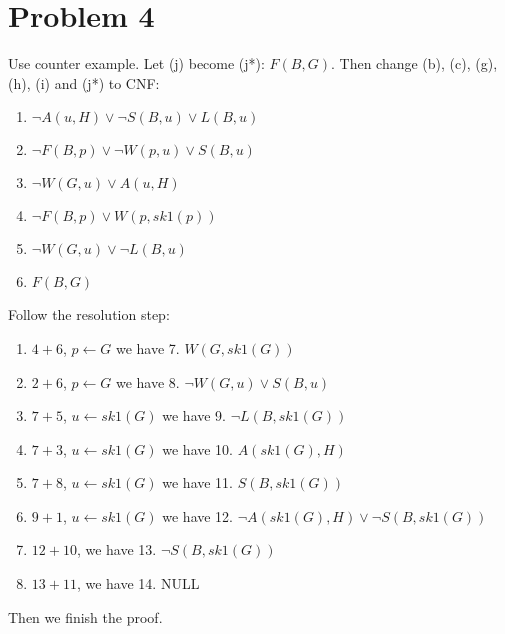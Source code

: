 \documentclass[11pt]{article}
\begin{document}
	\section*{Problem 4}
	Use counter example. Let (j) become (j*): $ F(B,G) $. Then change (b), (c), (g), (h), (i) and (j*) to CNF:
	\begin{enumerate}[1.]
		\item $ \neg A(u,H)\vee \neg S(B,u)\vee L(B,u) $
		\item $ \neg F(B,p)\vee \neg W(p,u)\vee S(B,u) $
		\item $ \neg W(G,u)\vee A(u,H) $
		\item $ \neg F(B,p)\vee W(p,sk1(p)) $
		\item $ \neg W(G,u)\vee \neg L(B,u) $
		\item $ F(B,G) $
	\end{enumerate}
	Follow the resolution step:
	\begin{enumerate}
		\item $ 4 + 6 $, $ p\leftarrow G $ we have 7. $ W(G,sk1(G)) $
		\item $ 2+6 $, $ p\leftarrow G $ we have 8. $ \neg W(G,u)\vee S(B,u) $
		\item $ 7+5 $, $ u\leftarrow sk1(G) $ we have 9. $ \neg L(B,sk1(G)) $
		\item $ 7+3 $, $ u\leftarrow sk1(G) $ we have 10. $ A(sk1(G),H) $
		\item $ 7+8 $, $ u\leftarrow sk1(G) $ we have 11. $ S(B,sk1(G)) $
		\item $ 9+1 $, $ u\leftarrow sk1(G) $ we have 12. $ \neg A(sk1(G),H)\vee \neg S(B,sk1(G)) $
		\item $ 12+10 $, we have 13. $ \neg S(B,sk1(G)) $
		\item $ 13+11 $, we have 14. NULL
	\end{enumerate}
	Then we finish the proof.
\end{document}
